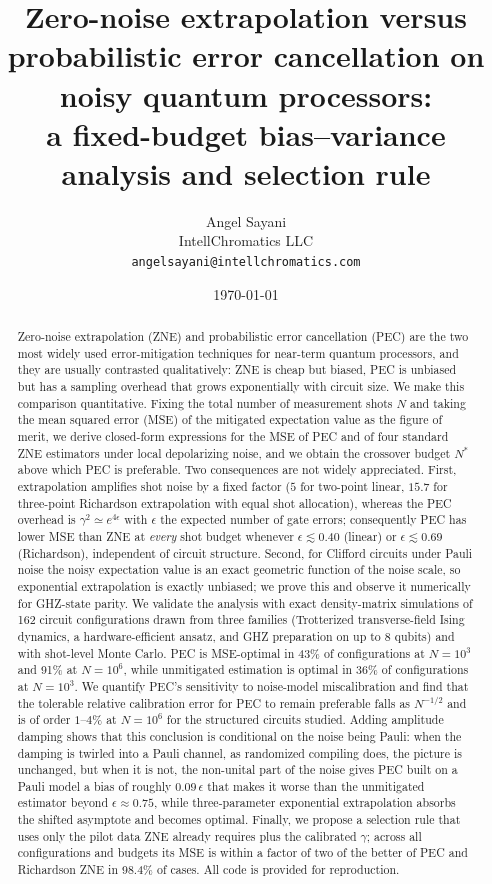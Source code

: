 \documentclass[11pt,a4paper]{article}
\title{\textbf{Zero-noise extrapolation versus probabilistic error cancellation on noisy quantum processors:\\ a fixed-budget bias--variance analysis and selection rule}}
\author{Angel Sayani\\[2pt]
\small IntellChromatics LLC\\
\small \texttt{angelsayani@intellchromatics.com}}
\date{\today}
\theoremstyle{remark}
\newcommand{\eps}{\epsilon}
\begin{document}
\maketitle

\begin{abstract}
Zero-noise extrapolation (ZNE) and probabilistic error cancellation (PEC) are the two most widely used error-mitigation techniques for near-term quantum processors, and they are usually contrasted qualitatively: ZNE is cheap but biased, PEC is unbiased but has a sampling overhead that grows exponentially with circuit size. We make this comparison quantitative. Fixing the total number of measurement shots $N$ and taking the mean squared error (MSE) of the mitigated expectation value as the figure of merit, we derive closed-form expressions for the MSE of PEC and of four standard ZNE estimators under local depolarizing noise, and we obtain the crossover budget $N^*$ above which PEC is preferable. Two consequences are not widely appreciated. First, extrapolation amplifies shot noise by a fixed factor ($5$ for two-point linear, $15.7$ for three-point Richardson extrapolation with equal shot allocation), whereas the PEC overhead is $\gamma^2 \simeq e^{4\eps}$ with $\eps$ the expected number of gate errors; consequently PEC has lower MSE than ZNE at \emph{every} shot budget whenever $\eps \lesssim 0.40$ (linear) or $\eps \lesssim 0.69$ (Richardson), independent of circuit structure. Second, for Clifford circuits under Pauli noise the noisy expectation value is an exact geometric function of the noise scale, so exponential extrapolation is exactly unbiased; we prove this and observe it numerically for GHZ-state parity. We validate the analysis with exact density-matrix simulations of 162 circuit configurations drawn from three families (Trotterized transverse-field Ising dynamics, a hardware-efficient ansatz, and GHZ preparation on up to 8 qubits) and with shot-level Monte Carlo. PEC is MSE-optimal in 43\% of configurations at $N=10^3$ and 91\% at $N=10^6$, while unmitigated estimation is optimal in 36\% of configurations at $N=10^3$. We quantify PEC's sensitivity to noise-model miscalibration and find that the tolerable relative calibration error for PEC to remain preferable falls as $N^{-1/2}$ and is of order $1$--$4\%$ at $N=10^6$ for the structured circuits studied. Adding amplitude damping shows that this conclusion is conditional on the noise being Pauli: when the damping is twirled into a Pauli channel, as randomized compiling does, the picture is unchanged, but when it is not, the non-unital part of the noise gives PEC built on a Pauli model a bias of roughly $0.09\,\eps$ that makes it worse than the unmitigated estimator beyond $\eps\approx0.75$, while three-parameter exponential extrapolation absorbs the shifted asymptote and becomes optimal. Finally, we propose a selection rule that uses only the pilot data ZNE already requires plus the calibrated $\gamma$; across all configurations and budgets its MSE is within a factor of two of the better of PEC and Richardson ZNE in 98.4\% of cases. All code is provided for reproduction.
\end{abstract}
\end{document}
